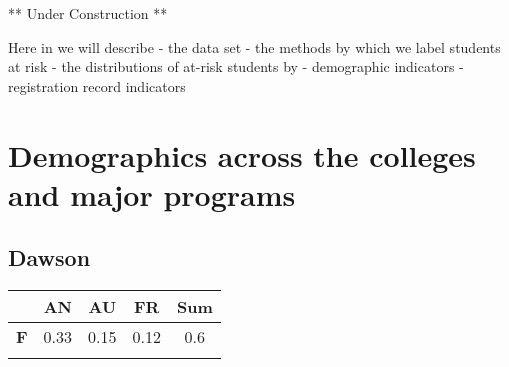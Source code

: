 \documentclass[]{book}
\theoremstyle{definition}
\theoremstyle{definition}
\theoremstyle{remark}
\begin{document}
** Under Construction **

Here in we will describe - the data set - the methods by which we label
students at risk - the distributions of at-risk students by -
demographic indicators - registration record indicators

\section{Demographics across the colleges and major
programs}\label{demographics-across-the-colleges-and-major-programs}

\subsection{Dawson}\label{dawson}

\begin{longtable}[]{@{}ccccc@{}}
\toprule
\begin{minipage}[b]{0.12\columnwidth}\centering\strut
~\strut
\end{minipage} & \begin{minipage}[b]{0.06\columnwidth}\centering\strut
AN\strut
\end{minipage} & \begin{minipage}[b]{0.06\columnwidth}\centering\strut
AU\strut
\end{minipage} & \begin{minipage}[b]{0.06\columnwidth}\centering\strut
FR\strut
\end{minipage} & \begin{minipage}[b]{0.06\columnwidth}\centering\strut
Sum\strut
\end{minipage}\tabularnewline
\midrule
\endhead
\begin{minipage}[t]{0.12\columnwidth}\centering\strut
\textbf{F}\strut
\end{minipage} & \begin{minipage}[t]{0.06\columnwidth}\centering\strut
0.33\strut
\end{minipage} & \begin{minipage}[t]{0.06\columnwidth}\centering\strut
0.15\strut
\end{minipage} & \begin{minipage}[t]{0.06\columnwidth}\centering\strut
0.12\strut
\end{minipage} & \begin{minipage}[t]{0.06\columnwidth}\centering\strut
0.6\strut
\end{minipage}\tabularnewline
\begin{minipage}[t]{0.12\columnwidth}\centering\strut

\end{minipage}
\end{longtable}
\end{document}

